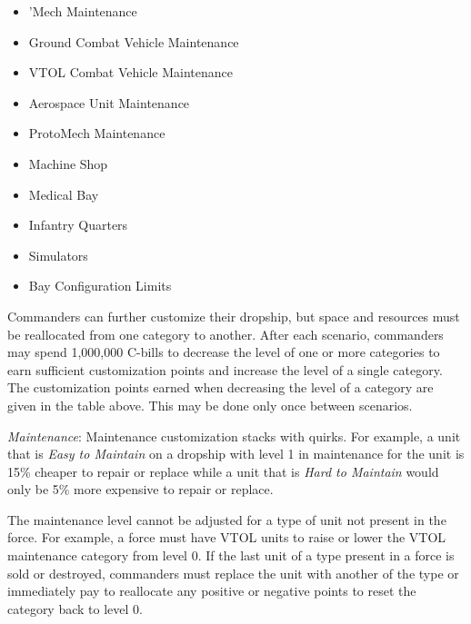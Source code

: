 \begin{itemize}

\item 'Mech Maintenance

\item Ground Combat Vehicle Maintenance

\item VTOL Combat Vehicle Maintenance

\item Aerospace Unit Maintenance

\item ProtoMech Maintenance

\item Machine Shop

\item Medical Bay

\item Infantry Quarters

\item Simulators

\item Bay Configuration Limits

\end{itemize}


Commanders can further customize their dropship, but space and resources must be reallocated from one category to another.
After each scenario, commanders may spend 1,000,000 C-bills to decrease the level of one or more categories to earn sufficient customization points and increase the level of a single category.
The customization points earned when decreasing the level of a category are given in the table above.
This may be done only once between scenarios.

\emph{Maintenance}: Maintenance customization stacks with quirks.
For example, a unit that is \emph{Easy to Maintain} on a dropship with level 1 in maintenance for the unit is 15\% cheaper to repair or replace while a unit that is \emph{Hard to Maintain} would only be 5\% more expensive to repair or replace.

The maintenance level cannot be adjusted for a type of unit not present in the force.
For example, a force must have VTOL units to raise or lower the VTOL maintenance category from level 0.
If the last unit of a type present in a force is sold or destroyed, commanders must replace the unit with another of the type or immediately pay to reallocate any positive or negative points to reset the category back to level 0.
